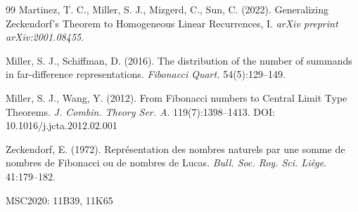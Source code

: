 \documentclass[11pt]{amsart}
\theoremstyle{plain}
\numberwithin{equation}{section} %
\numberwithin{table}{section} %
\numberwithin{figure}{section}
\begin{document}
\begin{thebibliography}{99}
		Martinez, T. C., Miller, S. J., Mizgerd, C., Sun, C. (2022). Generalizing {Z}eckendorf's {T}heorem to {H}omogeneous {L}inear {R}ecurrences, {I}. \textit{arXiv preprint arXiv:2001.08455}.
		
		Miller, S. J., Schiffman, D. (2016). The distribution of the number of summands in far-difference representations. \textit{Fibonacci Quart.} 54(5):129--149.
		
		Miller, S. J., Wang, Y. (2012). From {F}ibonacci numbers to {C}entral {L}imit {T}ype {T}heorems. \textit{J. Combin. Theory Ser. A}. 119(7):1398--1413. DOI: 10.1016/j.jcta.2012.02.001
		
		Zeckendorf, E. (1972). Repr{\'e}sentation des nombres naturels par une somme de nombres de {F}ibonacci ou de nombres de {L}ucas. \textit{Bull. Soc. Roy. Sci. Li{\`e}ge}. 41:179--182.
		
	\end{thebibliography}
	
	\noindent MSC2020: 11B39, 11K65
	
	
\end{document}
